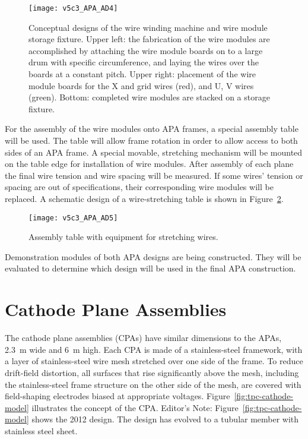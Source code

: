 \begin{figure}[htpb]
\centering
\texttt{[image: v5c3\_APA\_AD4]}
\caption[Conceptual designs of the wire winding machine and wire module storage fixture]{Conceptual designs of the wire winding machine and wire module storage fixture.  Upper left: the fabrication of the wire modules are accomplished by attaching the wire module boards on to a large drum with specific circumference, and laying the wires over the boards at a constant pitch.  Upper right: placement of the wire module boards for the X and grid wires (red), and U, V wires (green).  Bottom: completed wire modules are stacked on a storage fixture.   }
\label{fig:tpc-APA-AD4}
\end{figure}


For the assembly of the wire modules onto APA frames, a special assembly table will be used. The table will allow frame rotation in order to allow access to both sides of an APA frame. A special movable, 
stretching mechanism will be mounted on the table edge for installation of wire modules. After assembly of each plane the final wire tension and wire spacing will be measured. If some wires' tension or spacing 
are out of specifications, their corresponding wire modules will be replaced. A schematic design of a wire-stretching table is shown in Figure~\ref{fig:tpc-APA-AD5}. 
                                
 
\begin{figure}[htpb]
\centering
\texttt{[image: v5c3\_APA\_AD5]}
\caption{Assembly table with equipment for stretching wires.}
\label{fig:tpc-APA-AD5}
\end{figure}
                          
Demonstration modules of both APA designs are being constructed. They will be evaluated to determine which design will be used in the final APA construction.

\section{Cathode Plane Assemblies}
\label{subsec:v5-tpc-chamber-cathode}

The cathode plane assemblies (CPAs) have similar dimensions to the APAs, 
2.3~m wide and 6~m high. Each CPA is made of a stainless-steel framework, 
with a layer of stainless-steel wire mesh stretched over one side 
of the frame. To reduce drift-field distortion, all surfaces that rise
significantly above the mesh, including the stainless-steel 
frame structure on the other side of the mesh, are covered with 
field-shaping electrodes biased at appropriate voltages. 
Figure~\ref{fig:tpc-cathode-model} illustrates the concept of the 
CPA. 
\notestart
Editor's Note: Figure~\ref{fig:tpc-cathode-model} shows the 2012 design. The design has evolved to a tubular member with stainless steel sheet.
\notestop

